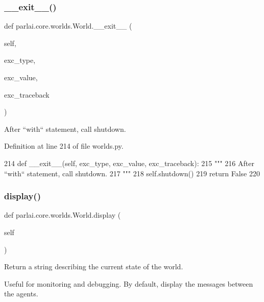 \subsubsection{\texorpdfstring{\+\_\+\+\_\+exit\+\_\+\+\_\+()}{\_\_exit\_\_()}}
{\footnotesize\ttfamily def parlai.\+core.\+worlds.\+World.\+\_\+\+\_\+exit\+\_\+\+\_\+ (\begin{DoxyParamCaption}\item[{}]{self,  }\item[{}]{exc\+\_\+type,  }\item[{}]{exc\+\_\+value,  }\item[{}]{exc\+\_\+traceback }\end{DoxyParamCaption})}

\begin{DoxyVerb}After ``with`` statement, call shutdown.
\end{DoxyVerb}
 

Definition at line 214 of file worlds.\+py.


\begin{DoxyCode}
214     \textcolor{keyword}{def }\_\_exit\_\_(self, exc\_type, exc\_value, exc\_traceback):
215         \textcolor{stringliteral}{"""}
216 \textcolor{stringliteral}{        After ``with`` statement, call shutdown.}
217 \textcolor{stringliteral}{        """}
218         self.shutdown()
219         \textcolor{keywordflow}{return} \textcolor{keyword}{False}
220 
\end{DoxyCode}
\mbox{\label{classparlai_1_1core_1_1worlds_1_1World_a147371097765449933ca963215eba603}} 
\subsubsection{\texorpdfstring{display()}{display()}}
{\footnotesize\ttfamily def parlai.\+core.\+worlds.\+World.\+display (\begin{DoxyParamCaption}\item[{}]{self }\end{DoxyParamCaption})}

\begin{DoxyVerb}Return a string describing the current state of the world.

Useful for monitoring and debugging. By default, display the messages between
the agents.
\end{DoxyVerb}
 

